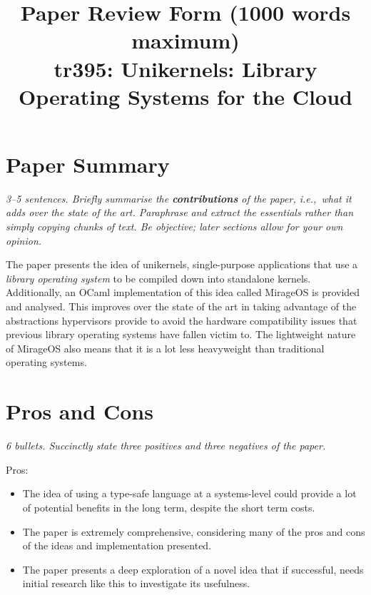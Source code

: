 \documentclass[11pt]{article}
\begin{document}
\title{Paper Review Form (1000 words maximum)\\
    tr395: Unikernels: Library Operating Systems for the Cloud \cite{Unikernels}}

\maketitle

\section*{Paper Summary}

\textsl{3--5 sentences. Briefly summarise the {\bf contributions} of the paper,
i.e.,~what it adds over the state of the art. Paraphrase and extract the
essentials rather than simply copying chunks of text. Be objective; later
sections allow for your own opinion.}

The paper presents the idea of unikernels, single-purpose applications that use
a \textit{library operating system} to be compiled down into standalone
kernels. Additionally, an OCaml implementation of this idea called MirageOS is
provided and analysed. This improves over the state of the art in taking
advantage of the abstractions hypervisors provide to avoid the hardware
compatibility issues that previous library operating systems have fallen
victim to. The lightweight nature of MirageOS also means that it is a lot less
heavyweight than traditional operating systems.

\section*{Pros and Cons}

\textsl{6 bullets. Succinctly state three positives and three negatives of the
paper.}

Pros:

\begin{itemize}

    \item The idea of using a type-safe language at a systems-level could
    provide a lot of potential benefits in the long term, despite the short
    term costs.

    \item The paper is extremely comprehensive, considering many of the pros
    and cons of the ideas and implementation presented.

    \item The paper presents a deep exploration of a novel idea that if
    successful, needs initial research like this to investigate its usefulness.


\end{itemize}
\end{document}
